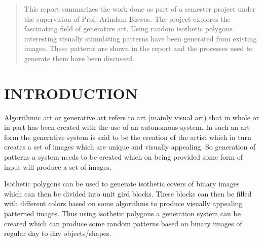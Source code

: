 \documentclass[12pt]{article}
\begin{document}
\begin{abstract}
This report summarizes the work done as part of a semester project under the supervision of Prof. Arindam Biswas. The project explores the fascinating field of generative art. Using random isothetic polygons interesting visually stimulating patterns have been generated from existing images. These patterns are shown in the report and the processes used to generate them have been discussed.

\end{abstract}








\newpage




\tableofcontents




\newpage


\newenvironment{mydef}[1]{\begin{definition} #1 \mbox{\\}
\rm}{\end{definition}}



\section{INTRODUCTION}
Algorithmic art or generative art refers to art (mainly visual art) that in whole or in part has been created with the use of an autonomous system. In such an art form the generative system is said to be the creation of the artist which in turn creates a set of images which are unique and visually appealing.  
So generation of patterns a system needs to be created which on being provided some form of input will produce a set of images.

\vspace{0.3cm} 
Isothetic polygons can be used to generate isothetic covers of binary images which can then be divided into unit gird blocks. These blocks can then be filled with different colors based on some algorithms to produce visually appealing patterned images. Thus using isothetic polygons a generation system can be created which can produce some random patterns based on binary images of regular day to day objects/shapes. 
\vspace{0.3cm}
\end{document}

